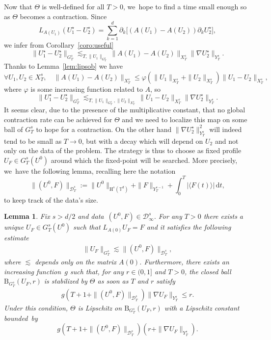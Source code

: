 \documentclass[JEP,XML,SOM,Unicode,published]{cedram}
\newtheorem{lem}[prop]{Lemma}
\theoremstyle{definition}
\newcommand\T{\mathbb{T}}
\newcommand\dd{\mathrm{d}}
\newcommand\B{\mathrm{B}}
\renewcommand\H{\mathrm{H}}
\let\ffi\varphi
\begin{document}
Now that $\Theta$ is well-defined for all $T>0$, we~hope to find a time small enough so as $\Theta$ becomes a contraction. Since\vspace*{-3pt}
\[
L_{A(U_1)}(U_1^\star - U_2^\star) = \sum_{k=1}^d \partial_k\bigl[(A(U_1)-A(U_2))\partial_k U_2^\star\bigr],
\]we infer from Corollary~\ref{coro:useful}\vspace*{-3pt}
\[
\|U_1^\star - U_2^\star\|_{G_T^s} \lesssim_{T,\|U_1\|_{G_T^s}} \|A(U_1)-A(U_2)\|_{X_T^s} \|\nabla U_2^\star\|_{Y_T^s}.
\]
Thanks to Lemma~\ref{lem:lipsob} we have
\begin{equation}\label{ineq:lipAvrai}
\forall U_1,U_2\in X_T^s,\quad \|A(U_1)-A(U_2)\|_{X_T^s} \leq \ffi(\|U_1\|_{X_T^s}+\|U_2\|_{X_T^s})\|U_1-U_2\|_{X_T^s},
\end{equation}
where $\ffi$ is some increasing function related to $A$, so
\begin{equation}\label{ineq:contrapa}
\|U_1^\star - U_2^\star\|_{G_T^s} \lesssim_{T,\|U_1\|_{G_T^s}, \|U_2\|_{X_T^s}} \|U_1-U_2\|_{X_T^s} \|\nabla U_2^\star\|_{Y_T^s}.
\end{equation}
It seems clear, due to the presence of the multiplicative constant, that no global contraction rate can be achieved for $\Theta$ and we need to localize this map on some ball of $G_T^s$ to hope for a contraction. On the other hand $\|\nabla U_2^\star \|_{Y_T^s}^2$ will indeed tend to be small as $T\to 0$, but with a decay which will depend on $U_2$ and not only on the data of the problem. The strategy is thus to choose as fixed profile $U_F\in G_{T}^s(U^0)$ around which the fixed-point will be searched. More precisely, we~have the following lemma, recalling here the notation\vspace*{-3pt}
\[
\| (U^0,F)\| _{\mathcal D_T^{s}}:=\|U^0\|_{\H^s(\T^d)}+\|F\|_{Y_T^{s-1}}+\int_0^T |\langle F(t)\rangle|\,\dd t,
\]
to keep track of the data's size.
\begin{lem}\label{lem:contraction}
Fix $s>d/2$ and data~$(U^0,F) \in \mathcal D_\infty^s$. For any $T>0$ there exists a unique $U_F\in G_T^s(U^0)$ such that $L_{A(0)} U_F = F$ and it satisfies the following estimate
\begin{align}\label{ineq:UF}
\|U_F\|_{G_T^s} \lesssim \| (U^0,F)\| _{\mathcal D_T^{s}},
\end{align}
where $\lesssim$ depends only on the matrix $A(0)$. Furthermore, there exists an increasing function~$g$ such that, for any $r\in(0,1]$ and $T>0$, the closed ball $\B_{G_T^s}(U_F,r)$ is stabilized by $\Theta$ as soon as $T$ and $r$ satisfy
\begin{align}\label{ineq:stabT}
g(T+1+ \| (U^0,F)\| _{\mathcal D_T^{s} })\|\nabla U_F\|_{Y_T^s} \leq r.
\end{align}
Under this condition, $\Theta$ is Lipschitz on $\B_{G_T^s}(U_F,r)$ with a Lipschitz constant bound\-ed~by
\[
g(T+1+ \| (U^0,F)\| _{\mathcal D_T^{s}})(r+\|\nabla U_F\|_{Y_T^s}).
\]
\end{lem}
\end{document}

